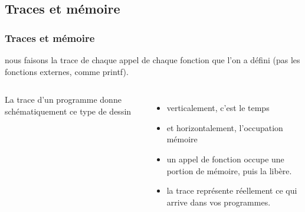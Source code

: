 \documentclass[xcolor=svgnames]{beamer}
\begin{document}
\subsection{Traces et mémoire}
\begin{frame}
  \frametitle{Traces et mémoire \nowrite}
\noindent {} 
nous faisons la trace de chaque appel de chaque fonction que
l'on a défini (pas les fonctions externes, comme printf). 

\begin{columns}
\column[T]{6cm}
La trace d'un programme donne schématiquement ce type de dessin
\begin{itemize}
  \item<3-> verticalement, c'est le temps
  \item<3-> et horizontalement, l'occupation mémoire
  \item<4-> un appel de fonction occupe une portion de mémoire, puis la
    libère. 
\item<5-> la trace représente réellement ce qui arrive dans vos programmes.
\end{itemize}


\end{columns}
\end{frame}
\end{document}
